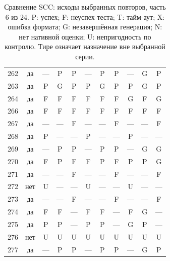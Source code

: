 \begin{table}[p]
\begin{tabular*}{\textwidth}{@{\extracolsep{\fill}}rc*{9}{c}@{}}
262 & да & — & P & P & — & P & P & — & G & P\\
263 & да & P & G & P & P & G & P & P & G & P\\
264 & да & F & F & F & F & F & F & G & F & G\\
266 & да & F & F & F & F & F & F & F & F & F\\
267 & да & — & — & F & — & — & F & — & — & F\\
268 & да & P & — & — & P & — & — & P & — & —\\
269 & да & — & P & P & — & P & P & — & G & G\\
270 & да & F & P & F & F & P & F & P & P & G\\
271 & да & — & — & F & — & — & F & — & — & F\\
272 & нет & U & — & — & U & — & — & U & — & —\\
273 & да & — & — & F & — & — & F & — & — & F\\
274 & да & F & F & — & F & F & — & F & G & —\\
275 & да & P & P & — & P & P & — & G & P & —\\
276 & нет & U & U & U & U & U & U & U & U & U\\
277 & да & — & P & P & — & P & P & — & G & P\\
\bottomrule\end{tabular*}
\caption{Сравнение SCC: исходы выбранных повторов, часть 6 из 24. P: успех; F: неуспех теста; T: тайм-аут; X: ошибка формата; G: незавершённая генерация; N: нет нативной оценки; U: непригодность по контролю. Тире означает назначение вне выбранной серии.}
\end{table}
\clearpage
